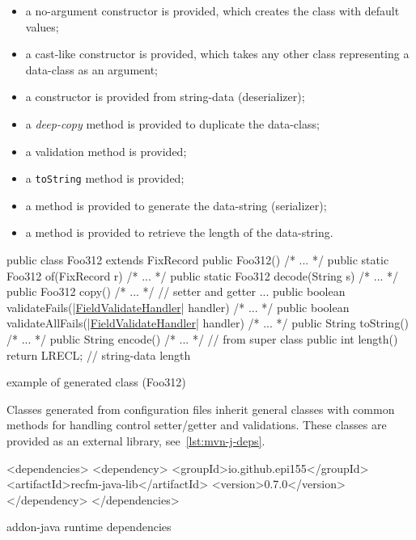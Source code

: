 \documentclass[a4paper,10pt]{report}
\newenvironment{elisting}[1][H]
  {\captionsetup{aboveskip=0pt}\begin{listing}[#1]}
  {\end{listing}%
}
\begin{document}
\begin{itemize}\setlength\itemsep{-0.5ex}
\item a no-argument constructor is provided, which creates the class with 
    default values;
\item a cast-like constructor is provided, which takes any other class 
    representing a data-class as an argument;
\item a constructor is provided from string-data (deserializer);
\item a \textit{deep-copy} method is provided to duplicate the data-class;
\item a validation method is provided;
\item a \texttt{toString} method is provided;
\item a method is provided to generate the data-string (serializer);
\item a method is provided to retrieve the length of the data-string.
\end{itemize}

\begin{elisting}[!htb]
\begin{javacode}
public class Foo312 extends FixRecord {
    public Foo312() { /* ... */ }
    public static Foo312 of(FixRecord r) { /* ... */ }
    public static Foo312 decode(String s) { /* ... */ }
    public Foo312 copy() { /* ... */ }
    // setter and getter ...
    public boolean validateFails(|\hyperref[lst:FieldValidateHandler:java]{FieldValidateHandler}| handler) { /* ... */ }
    public boolean validateAllFails(|\hyperref[lst:FieldValidateHandler:java]{FieldValidateHandler}| handler) { /* ... */ }
    public String toString() { /* ... */ }
    public String encode() { /* ... */ }    // from super class
    public int length() { return LRECL; }   // string-data length
}
\end{javacode}
\caption{example of generated class (Foo312)}
\label{lst:Foo312:java}
\end{elisting}

Classes generated from configuration files inherit general classes with common 
methods for handling control setter/getter and validations. These classes are 
provided as an external library, see~\ref{lst:mvn-j-deps}.

\begin{elisting}[!htb]
\begin{xmlcode}
<dependencies>
  <dependency>
    <groupId>io.github.epi155</groupId>
    <artifactId>recfm-java-lib</artifactId>
    <version>0.7.0</version>
  </dependency>
</dependencies>
\end{xmlcode}
\caption{addon-java runtime dependencies}
\label{lst:mvn-j-deps}
\end{elisting}
\end{document}
